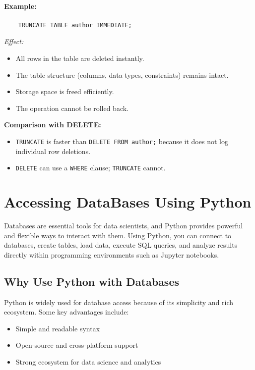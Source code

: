 \documentclass{article}
\begin{document}
\paragraph{Example:}
\begin{verbatim}
    TRUNCATE TABLE author IMMEDIATE;
\end{verbatim}
\textit{Effect:}
\begin{itemize}
    \item All rows in the table are deleted instantly.
    \item The table structure (columns, data types, constraints) remains intact.
    \item Storage space is freed efficiently.
    \item The operation cannot be rolled back.
\end{itemize}
\textbf{Comparison with DELETE:}
\begin{itemize}
    \item \texttt{TRUNCATE} is faster than \texttt{DELETE FROM author;} because it does not log individual row deletions.
    \item \texttt{DELETE} can use a \texttt{WHERE} clause; \texttt{TRUNCATE} cannot.
\end{itemize}


\newpage


\section{Accessing DataBases Using Python}


Databases are essential tools for data scientists, and Python provides powerful and flexible ways to interact with them.  
Using Python, you can connect to databases, create tables, load data, execute SQL queries, and analyze results directly within programming environments such as Jupyter notebooks.

\subsection{Why Use Python with Databases}

Python is widely used for database access because of its simplicity and rich ecosystem.  
Some key advantages include:
\begin{itemize}
    \item Simple and readable syntax
    \item Open-source and cross-platform support
    \item Strong ecosystem for data science and analytics
\end{itemize}
\end{document}

